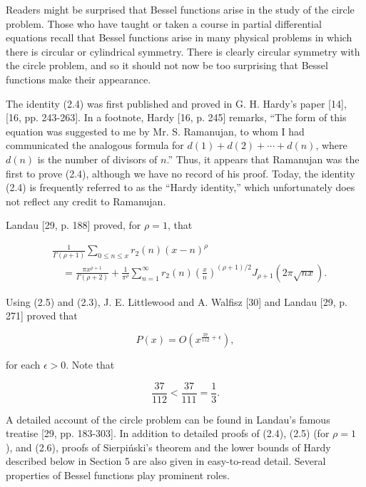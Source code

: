 \documentclass[10pt]{article}
\theoremstyle{plain}
\begin{document}
Readers might be surprised that Bessel functions arise in the study of the circle problem. Those who have taught or taken a course in partial differential equations recall that Bessel functions arise in many physical problems in which there is circular or cylindrical symmetry. There is clearly circular symmetry with the circle problem, and so it should not now be too surprising that Bessel functions make their appearance.

The identity (2.4) was first published and proved in G. H. Hardy's paper [14], [16, pp. 243-263]. In a footnote, Hardy [16, p. 245] remarks, ``The form of this equation was suggested to me by Mr. S. Ramanujan, to whom I had communicated the analogous formula for $d(1)+d(2)+\cdots+d(n)$, where $d(n)$ is the number of divisors of $n$.'' Thus, it appears that Ramanujan was the first to prove (2.4), although we have no record of his proof. Today, the identity (2.4) is frequently referred to as the ``Hardy identity,'' which unfortunately does not reflect any credit to Ramanujan.

Landau [29, p. 188] proved, for $\rho=1$, that

\begin{align*}
& \frac{1}{\Gamma(\rho+1)} \sum_{0 \leq n \leq x} r_{2}(n)(x-n)^{\rho} \\
& \quad=\frac{\pi x^{\rho+1}}{\Gamma(\rho+2)}+\frac{1}{\pi^{\rho}} \sum_{n=1}^{\infty} r_{2}(n)\left(\frac{x}{n}\right)^{(\rho+1)/2} J_{\rho+1}(2 \pi \sqrt{n x}) . \tag{2.5}
\end{align*}


Using (2.5) and (2.3), J. E. Littlewood and A. Walfisz [30] and Landau [29, p. 271] proved that


\begin{equation*}
P(x)=O\left(x^{\frac{37}{112}+\epsilon}\right), \tag{2.6}
\end{equation*}


for each $\epsilon>0$. Note that

$$
\frac{37}{112}<\frac{37}{111}=\frac{1}{3} .
$$

A detailed account of the circle problem can be found in Landau's famous treatise [29, pp. 183-303]. In addition to detailed proofs of (2.4), (2.5) (for $\rho=1$ ), and (2.6), proofs of Sierpiński's theorem and the lower bounds of Hardy described below in Section 5 are also given in easy-to-read detail. Several properties of Bessel functions play prominent roles.
\end{document}
